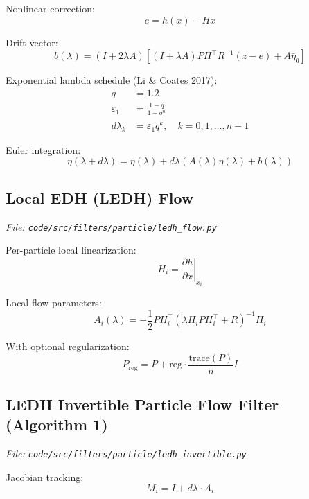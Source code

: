 \documentclass[12pt]{article}
\begin{document}
Nonlinear correction:
\begin{equation}
e = h(x) - Hx
\end{equation}

Drift vector:
\begin{equation}
b(\lambda) = (I + 2\lambda A) \left[ (I + \lambda A) P H^\top R^{-1} (z - e) + A \bar{\eta}_0 \right]
\end{equation}

Exponential lambda schedule (Li \& Coates 2017):
\begin{align}
q &= 1.2 \\
\varepsilon_1 &= \frac{1 - q}{1 - q^n} \\
d\lambda_k &= \varepsilon_1 q^k, \quad k = 0, 1, \ldots, n-1
\end{align}

Euler integration:
\begin{equation}
\eta(\lambda + d\lambda) = \eta(\lambda) + d\lambda (A(\lambda) \eta(\lambda) + b(\lambda))
\end{equation}

\subsection{Local EDH (LEDH) Flow}
\textit{File: \texttt{code/src/filters/particle/ledh\_flow.py}}

Per-particle local linearization:
\begin{equation}
H_i = \left.\frac{\partial h}{\partial x}\right|_{x_i}
\end{equation}

Local flow parameters:
\begin{equation}
A_i(\lambda) = -\frac{1}{2} P H_i^\top (\lambda H_i P H_i^\top + R)^{-1} H_i
\end{equation}

With optional regularization:
\begin{equation}
P_{\text{reg}} = P + \text{reg} \cdot \frac{\text{trace}(P)}{n} I
\end{equation}

\subsection{LEDH Invertible Particle Flow Filter (Algorithm 1)}
\textit{File: \texttt{code/src/filters/particle/ledh\_invertible.py}}

Jacobian tracking:
\begin{equation}
M_i = I + d\lambda \cdot A_i
\end{equation}
\end{document}

